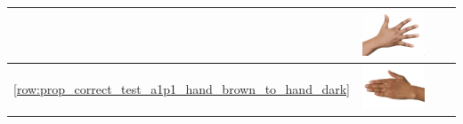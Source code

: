 \begin{longtable}{|c||c|c|c|}
\begin{minipage}{.29\textwidth}
  \end{minipage} & 
  \begin{minipage}{.29\textwidth}
    \includegraphics[width=\textwidth,height=\textheight,keepaspectratio]{../rc_test/outputs/20170522_proportional_corrected_test_alpha1p1/hand_dark_to_hand_light.jpg}
  \end{minipage} \\
    \hline  \ref{row:prop_correct_test_a1p1_hand_brown_to_hand_dark} &
  \begin{minipage}{.29\textwidth}
    \includegraphics[width=\textwidth,height=\textheight,keepaspectratio]{../inputs/hand_brown.jpg}
  \end{minipage} & 
  \begin{minipage}{.29\textwidth}

\end{minipage}
\end{longtable}
